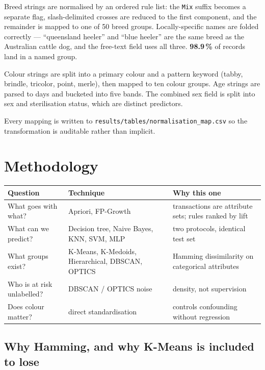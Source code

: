 \documentclass[11pt,a4paper]{article}
\begin{document}
Breed strings are normalised by an ordered rule list: the \texttt{Mix} suffix
becomes a separate flag, slash-delimited crosses are reduced to the first
component, and the remainder is mapped to one of 50 breed groups.
Locally-specific names are folded correctly --- ``queensland heeler'' and ``blue
heeler'' are the same breed as the Australian cattle dog, and the free-text
field uses all three. \textbf{98.9\,\%} of records land in a named group.

Colour strings are split into a primary colour and a pattern keyword (tabby,
brindle, tricolor, point, merle), then mapped to ten colour groups. Age strings
are parsed to days and bucketed into five bands. The combined sex field is split
into sex and sterilisation status, which are distinct predictors.

Every mapping is written to \texttt{results/tables/normalisation\_map.csv} so
the transformation is auditable rather than implicit.

\section{Methodology}

\begin{center}
\small
\begin{tabular}{@{}L{3.6cm}L{5.4cm}L{5.8cm}@{}}
\toprule
\textbf{Question} & \textbf{Technique} & \textbf{Why this one} \\
\midrule
What goes with what? & Apriori, FP-Growth & transactions are attribute sets;
rules ranked by lift \\
What can we predict? & Decision tree, Naive Bayes, KNN, SVM, MLP & two
protocols, identical test set \\
What groups exist? & K-Means, K-Medoids, Hierarchical, DBSCAN, OPTICS & Hamming
dissimilarity on categorical attributes \\
Who is at risk unlabelled? & DBSCAN / OPTICS noise & density, not supervision \\
Does colour matter? & direct standardisation & controls confounding without
regression \\
\bottomrule
\end{tabular}
\end{center}

\subsection{Why Hamming, and why K-Means is included to lose}
\label{sec:hamming}
\end{document}
